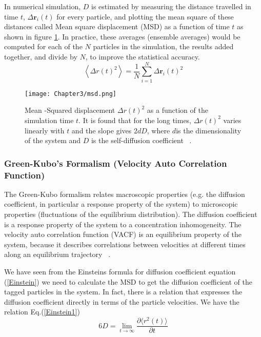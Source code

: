      In numerical simulation,  $D$ is estimated by measuring  the distance travelled in time $t$, $\Delta \mathbf{r}_i(t)$ for every particle, and plotting the mean square of these distances called Mean square displacement (MSD) as a function of time $t$ as shown in figure \ref{MSD}.  In practice, these averages (ensemble averages) would be computed for each of the $N$ particles
     in the simulation, the results added together, and  divide by $N$, to improve the statistical accuracy.    
     \begin{equation}
        \left\langle \Delta r(t)^2 \right\rangle = \frac{1}{N} \sum_{i=1}^N \Delta \mathbf{r}_i(t)^2
        \end{equation}
    \begin{figure}[h!]
         \centering
         \texttt{[image: Chapter3/msd.png]}
         \caption[Mean-Squared displacement as a function of the simulation time.]{Mean -Squared displacement $\Delta r(t)^2$ as a function of the simulation time $t$. It is found that for the long times, $\Delta r(t)^2$ varies linearly with $t$ and the slope gives $2dD$, where $d$is the dimensionality  of the system and $D$ is the self-diffusion coefficient~ \citep{Frenkel2002}.} 
         \label{MSD}
         \end{figure}    
  \subsubsection{Green-Kubo's Formalism (Velocity Auto Correlation Function)}
  The Green-Kubo formalism relates macroscopic properties (e.g. the diffusion coefficient, in particular a response property of the system) to microscopic properties (fluctuations of the equilibrium distribution). The diffusion coefficient is a response property of the system to a concentration inhomogeneity. The velocity auto correlation function (VACF) is an equilibrium property of the system, because it describes correlations between velocities at different times along an equilibrium trajectory~ \citep{Frenkel2002}.
  
   We have seen from the Einsteins formula for diffusion coefficient equation (\ref{Einstein}) we need to calculate the MSD to get the diffusion coefficient of the tagged particles in the system. In fact, there is a relation that expresses the diffusion coefficient directly in terms of the particle velocities. We have the relation Eq.(\ref{Einstein1}) 
   \begin{equation}
    6 D = \lim_{t \to \infty} \frac{\partial \langle r^2(t) \rangle}{\partial t}
    \label{msd1}
    \end{equation}
    
